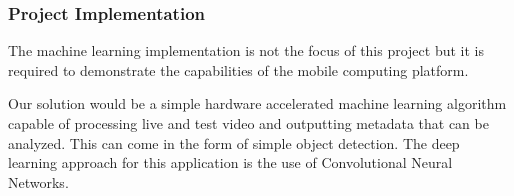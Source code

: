 
\subsubsection{Project Implementation}
The machine learning implementation is not the focus of this project but it is required to demonstrate the capabilities of the mobile computing platform. 

Our solution would be a simple hardware accelerated machine learning algorithm capable of processing live and test video and outputting metadata that can be analyzed. This can come in the form of simple object detection. The deep learning approach for this application is the use of Convolutional Neural Networks.

